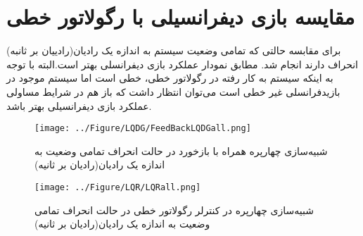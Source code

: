\section{مقایسه بازی دیفرانسیلی با رگولاتور خطی}
برای مقابسه حالتی که تمامی وضعیت سیستم به اندازه یک رادیان(رادییان بر ثانبه) انحراف دارند انجام شد. مطابق نمودار عملکرد بازی دیفرانسلی بهتر است.البته با توجه به اینکه سیستم به کار رفته در رگولاتور خطی، خطی است اما سیستم موجود در بازیدفرانسلی غیر خطی است می‌توان انتظار داشت که باز هم در شرایط مساولی عملکرد بازی دیفرانسیلی بهتر باشد.
\newpage
\begin{figure}[H]
	\texttt{[image: ../Figure/LQDG/FeedBackLQDGall.png]}
	\centering
	\caption{شبیه‌‌سازی چهارپره همراه با بازخورد در حالت انحراف تمامی وضعیت به اندازه یک رادیان(رادیان بر ثانیه)}
\end{figure}
\begin{figure}[H]
	\texttt{[image: ../Figure/LQR/LQRall.png]}
	\centering
	\caption{شبیه‌‌سازی چهارپره در کنترلر رگولاتور خطی در حالت انحراف تمامی وضعیت به اندازه یک رادیان(رادیان بر ثانیه)}
\end{figure}